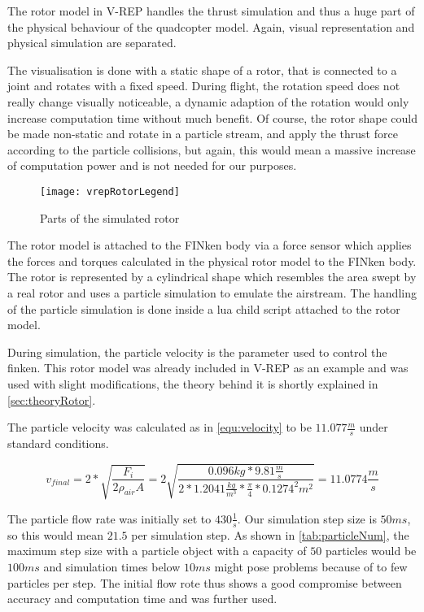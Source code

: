 The rotor model in V-REP handles the thrust simulation and thus a huge part of the physical behaviour of the quadcopter model.  
Again, visual representation and physical simulation are separated. 

The visualisation is done with a static shape of a rotor, that is connected to a joint and rotates with a fixed speed. 
During flight, the rotation speed does not really change visually noticeable, a dynamic adaption of the rotation would only increase computation time without much benefit. 
Of course, the rotor shape could be made non-static and rotate in a particle stream, and apply the thrust force according to the particle collisions, but again, this would mean a massive increase of computation power and is not needed for our purposes.

\begin{figure}[h!]
 \begin{center}
  \texttt{[image: vrepRotorLegend]}
 \end{center}
  \caption{Parts of the simulated rotor \label{fig:vrepRotor}}
\end{figure}


The rotor model is attached to the FINken body via a force sensor which applies the forces and torques calculated in the physical rotor model to the FINken body. 
The rotor is represented by a cylindrical shape which resembles the area swept by a real rotor and uses a particle simulation to emulate the airstream. The handling of the particle simulation is done inside a lua child script attached to the rotor model.
 
 
During simulation, the particle velocity is the parameter used to control the finken. This rotor model was already included in V-REP as an example and was used with slight  modifications, the theory behind it is shortly explained in \ref{sec:theoryRotor}. 

The particle velocity was calculated as in \ref{equ:velocity} to be $11.077 \frac{m}{s}$ under standard conditions.

 \begin{equation}
    v_{final}= 2 * \sqrt{\frac{ F_i}{2 \rho_{air} A}} = 2 \sqrt{\frac{ 0.096 kg * 9.81 \frac{m}{s}}{2 * 1.2041 \frac{kg}{m^3} * \frac{\pi}{4} * 0.1274^2 m^2}} = 11.0774 \frac{m}{s}
    \label{equ:velocity}
 \end{equation}
 
 
    
    The particle flow rate was initially set to $430 \frac{1}{s}$. 
    Our simulation step size is $50 ms$, so this would mean $21.5$ per simulation step. 
    As shown in \ref{tab:particleNum}, the maximum step size with a particle object with a capacity of $50$ particles would be $100 ms$ and simulation times below $10 ms$ might pose problems because of to few particles per step. 
   The initial flow rote thus shows a good compromise between accuracy and computation time and was further used.
    
